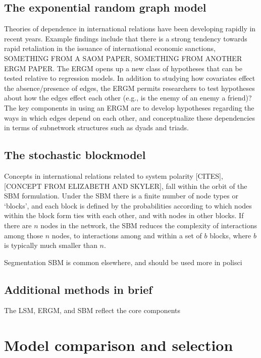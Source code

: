 \documentclass[fleqn,12pt]{wlscirep}
\begin{document}
\subsection{The exponential random graph model}

Theories of dependence in international relations have been developing rapidly in recent years. Example findings include that there is a strong tendency towards rapid retaliation in the issuance of international economic sanctions, SOMETHING FROM A SAOM PAPER, SOMETHING FROM ANOTHER ERGM PAPER.  The ERGM opens up a new class of hypotheses that can be tested relative to regression models. In addition to studying how covariates effect the absence/presence of edges, the ERGM permits researchers to test hypotheses about how the edges effect each other (e.g., is the enemy of an enemy a friend)? The key components in using an ERGM are to develop hypotheses regarding the ways in which edges depend on each other, and conceptualize these dependencies in terms of subnetwork structures such as dyads and triads.

\subsection{The stochastic blockmodel}

Concepts in international relations related to system polarity [CITES], [CONCEPT FROM ELIZABETH AND SKYLER], fall within the orbit of the SBM formulation. Under the SBM there is a finite number of node types or `blocks', and each block is defined by the probabilities according to which nodes within the block form ties with each other, and with nodes in other blocks. If there are $n$ nodes in the network, the SBM reduces the complexity of interactions among those $n$  nodes, to interactions among and within a set of $b$ blocks, where $b$ is typically much smaller than $n$. 


Segmentation SBM is common elsewhere, and should be used more in polisci

\subsection{Additional methods in brief}

The LSM, ERGM, and SBM reflect the core components


\section{Model comparison and selection}
\end{document}
